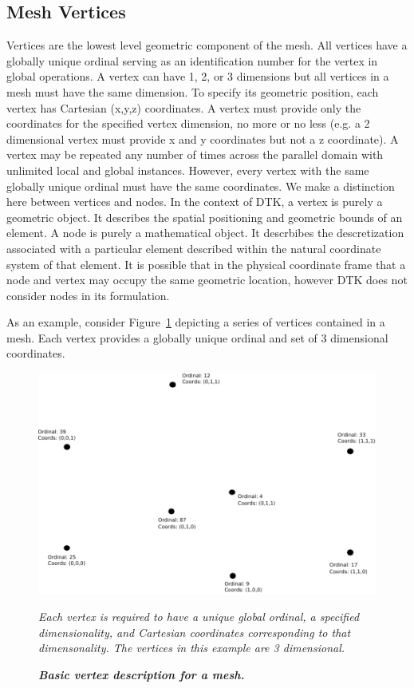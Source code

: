 \documentclass[letterpaper,12pt]{article}
\begin{document}
\subsection{Mesh Vertices}\label{subsec:vertices}
Vertices are the lowest level geometric component of the mesh. All
vertices have a globally unique ordinal serving as an identification
number for the vertex in global operations. A vertex can have 1, 2, or
3 dimensions but all vertices in a mesh must have the same
dimension. To specify its geometric position, each vertex has
Cartesian (x,y,z) coordinates. A vertex must provide only the
coordinates for the specified vertex dimension, no more or no less
(e.g. a 2 dimensional vertex must provide x and y coordinates but not
a z coordinate). A vertex may be repeated any number of times across
the parallel domain with unlimited local and global
instances. However, every vertex with the same globally unique ordinal
must have the same coordinates. We make a distinction here between
vertices and nodes. In the context of DTK, a vertex is purely a
geometric object. It describes the spatial positioning and geometric
bounds of an element. A node is purely a mathematical object. It
descrbibes the descretization associated with a particular element
described within the natural coordinate system of that element. It is
possible that in the physical coordinate frame that a node and vertex
may occupy the same geometric location, however DTK does not consider
nodes in its formulation.

As an example, consider Figure~\ref{fig:mesh_vertices} depicting a
series of vertices contained in a mesh. Each vertex provides a
globally unique ordinal and set of 3 dimensional coordinates.

\begin{figure}[htpb!]
  \centering \includegraphics[width=5in]{hex_nodes.pdf}
  \caption{\bf \sl Basic vertex description for a mesh.}{\sl Each
    vertex is required to have a unique global ordinal, a specified
    dimensionality, and Cartesian coordinates corresponding to that
    dimensonality. The vertices in this example are 3 dimensional.}
  \label{fig:mesh_vertices}
\end{figure}
\end{document}
